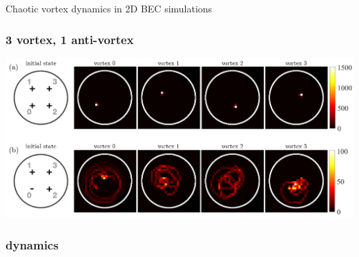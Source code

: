 \documentclass{beamer}
\begin{document}
\begin{frame}
\center \huge Chaotic vortex dynamics in 2D BEC simulations
\end{frame}

\begin{frame}
\frametitle{3 vortex, 1 anti-vortex}
\includegraphics[width=\textwidth]{../data/2d/histogram/histogram}

\end{frame}

\begin{frame}
\frametitle{dynamics}
\center {}
\end{frame}
\end{document}
